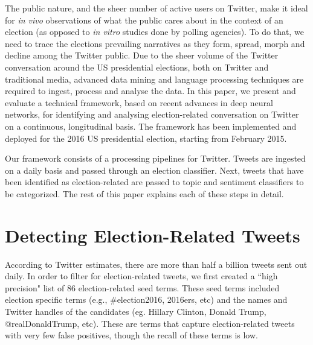 \documentclass[letterpaper]{article}
\begin{document}
The public nature, and the sheer number of active users on Twitter, make it ideal for \emph{in vivo} observations of what the public cares about in the context of an election (as opposed to \emph{in vitro} studies done by polling agencies). To do that, we need to trace the elections prevailing narratives as they form, spread, morph and decline among the Twitter public. Due to the sheer volume of the Twitter conversation around the US presidential elections, both on Twitter and traditional media, advanced data mining and language processing techniques are required to ingest, process and analyse the data. In this paper, we present and evaluate a technical framework, based on recent advances in deep neural networks, for identifying and analysing election-related conversation on Twitter on a continuous, longitudinal basis. The framework has been implemented and deployed for the 2016 US presidential election, starting from February 2015.

Our framework consists of a processing pipelines for Twitter. Tweets are ingested on a daily basis and passed through an election classifier. Next, tweets that have been identified as election-related are passed to topic and sentiment classifiers to be categorized. The rest of this paper explains each of these steps in detail. %














\section{Detecting Election-Related Tweets}
According to Twitter estimates, there are more than half a billion tweets sent out daily. In order to filter for election-related tweets, we first created a ``high precision" list of 86 election-related seed terms. These seed terms included election specific terms (e.g., \#election2016, 2016ers, etc) and the names and Twitter handles of the candidates (eg. Hillary Clinton, Donald Trump, @realDonaldTrump, etc). These are terms that capture election-related tweets with very few false positives, though the recall of these terms is low.
\end{document}
